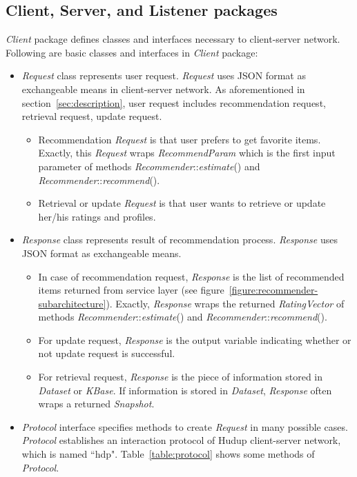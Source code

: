 \documentclass[a4paper,twoside]{article}
\begin{document}
\subsection{Client, Server, and Listener packages}
\label{subsec:client-server-listener-package}
\textit{Client} package defines classes and interfaces necessary to client-server network. Following are basic classes and interfaces in \textit{Client} package:
\begin{itemize}
\item \textit{Request} class represents user request. \textit{Request} uses JSON format \cite{ecma2013} as exchangeable means in client-server network. As aforementioned in section~\ref{sec:description}, user request includes recommendation request, retrieval request, update request.
  \begin{itemize}
  \item Recommendation \textit{Request} is that user prefers to get favorite items. Exactly, this \textit{Request} wraps \textit{RecommendParam} which is the first input parameter of methods \textit{Recommender}::\textit{estimate}() and \textit{Recommender}::\textit{recommend}().
  \item Retrieval or update \textit{Request} is that user wants to retrieve or update her/his ratings and profiles.
  \end{itemize}
\item \textit{Response} class represents result of recommendation process. \textit{Response} uses JSON format as exchangeable means.
  \begin{itemize}
  \item In case of recommendation request, \textit{Response} is the list of recommended items returned from service layer (see figure~\ref{figure:recommender-subarchitecture}). Exactly, \textit{Response} wraps the returned \textit{RatingVector} of methods \textit{Recommender}::\textit{estimate}() and \textit{Recommender}::\textit{recommend}().
  \item For update request, \textit{Response} is the output variable indicating whether or not update request is successful.
  \item For retrieval request, \textit{Response} is the piece of information stored in \textit{Dataset} or \textit{KBase}. If information is stored in \textit{Dataset}, \textit{Response} often wraps a returned \textit{Snapshot}.
  \end{itemize}
\item \textit{Protocol} interface specifies methods to create \textit{Request} in many possible cases. \textit{Protocol} establishes an interaction protocol of Hudup client-server network, which is named ``hdp". Table~\ref{table:protocol} shows some methods of \textit{Protocol}.

\end{itemize}
\end{document}
